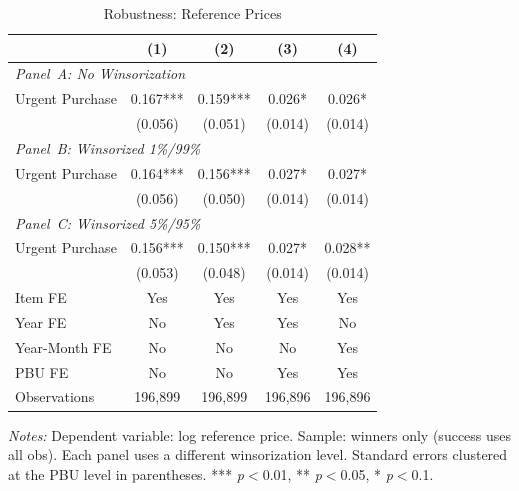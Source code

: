 \begin{table}[ht]
  \centering
  \caption{Robustness: Reference Prices}
  \label{tab:rob_ref_prices}
  \small
  \begin{threeparttable}
  \begin{tabular}{lcccc}
    \hline\hline
    & (1) & (2) & (3) & (4) \\
    \hline
    \multicolumn{5}{l}{\textit{Panel~A: No Winsorization}} \\[3pt]
    Urgent Purchase & 0.167*** & 0.159*** & 0.026* & 0.026* \\
     & (0.056) & (0.051) & (0.014) & (0.014) \\[3pt]
    \hline
    \multicolumn{5}{l}{\textit{Panel~B: Winsorized 1\%/99\%}} \\[3pt]
    Urgent Purchase & 0.164*** & 0.156*** & 0.027* & 0.027* \\
     & (0.056) & (0.050) & (0.014) & (0.014) \\[3pt]
    \hline
    \multicolumn{5}{l}{\textit{Panel~C: Winsorized 5\%/95\%}} \\[3pt]
    Urgent Purchase & 0.156*** & 0.150*** & 0.027* & 0.028** \\
     & (0.053) & (0.048) & (0.014) & (0.014) \\[3pt]
    \hline
    Item FE & Yes & Yes & Yes & Yes \\
    Year FE & No & Yes & Yes & No \\
    Year-Month FE & No & No & No & Yes \\
    PBU FE & No & No & Yes & Yes \\
    Observations & 196,899 & 196,899 & 196,896 & 196,896 \\
    \hline\hline
  \end{tabular}
  \begin{tablenotes}
    \small
    \item \textit{Notes:} Dependent variable: log reference price. Sample: winners only (success uses all obs). Each panel uses a different winsorization level. Standard errors clustered at the PBU level in parentheses. *** \textit{p}$<$0.01, ** \textit{p}$<$0.05, * \textit{p}$<$0.1.
  \end{tablenotes}
  \end{threeparttable}
\end{table}
